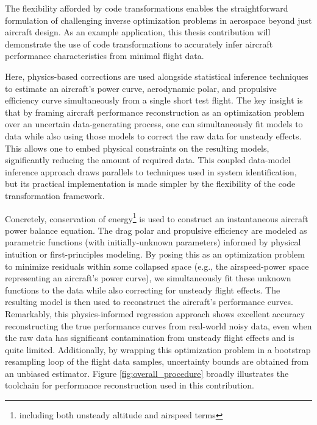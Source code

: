 \documentclass[12pt,vi,oneside,table]{report}
\begin{document}
    The flexibility afforded by code transformations enables the straightforward formulation of challenging inverse optimization problems in aerospace beyond just aircraft design. As an example application, this thesis contribution will demonstrate the use of code transformations to accurately infer aircraft performance characteristics from minimal flight data.

    Here, physics-based corrections are used alongside statistical inference techniques to estimate an aircraft's power curve, aerodynamic polar, and propulsive efficiency curve simultaneously from a single short test flight. The key insight is that by framing aircraft performance reconstruction as an optimization problem over an uncertain data-generating process, one can simultaneously fit models to data while also using those models to correct the raw data for unsteady effects. This allows one to embed physical constraints on the resulting models, significantly reducing the amount of required data. This coupled data-model inference approach draws parallels to techniques used in system identification, but its practical implementation is made simpler by the flexibility of the code transformation framework.

    Concretely, conservation of energy\footnote{including both unsteady altitude and airspeed terms} is used to construct an instantaneous aircraft power balance equation. The drag polar and propulsive efficiency are modeled as parametric functions (with initially-unknown parameters) informed by physical intuition or first-principles modeling. By posing this as an optimization problem to minimize residuals within some collapsed space (e.g., the airspeed-power space representing an aircraft's power curve), we simultaneously fit these unknown functions to the data while also correcting for unsteady flight effects. The resulting model is then used to reconstruct the aircraft's performance curves. Remarkably, this physics-informed regression approach shows excellent accuracy reconstructing the true performance curves from real-world noisy data, even when the raw data has significant contamination from unsteady flight effects and is quite limited. Additionally, by wrapping this optimization problem in a bootstrap resampling loop of the flight data samples, uncertainty bounds are obtained from an unbiased estimator. Figure \ref{fig:overall_procedure} broadly illustrates the toolchain for performance reconstruction used in this contribution.
\end{document}

